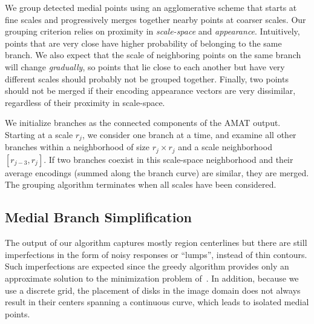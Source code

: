\documentclass[10pt,twocolumn,letterpaper]{article}
\begin{document}
We group detected medial points using an agglomerative scheme that starts at fine scales and
progressively merges together nearby points at coarser scales.
Our grouping criterion relies on proximity in \emph{scale-space} and \emph{appearance}.
Intuitively, points that are very close have higher probability of belonging to the same branch.
We also expect that the scale of neighboring points on the same branch will change \emph{gradually},
so points that lie close to each another but have very different scales should probably not be grouped together.
Finally, two points should not be merged if their encoding appearance vectors are very dissimilar,
regardless of their proximity in scale-space. 

We initialize branches as the connected components of the AMAT output.
Starting at a scale $r_j$, we consider one branch at a time, and examine all other
branches within a neighborhood of size $r_j \times r_j$ and a scale neighborhood $[r_{j-3},r_j]$.
If two branches coexist in this scale-space neighborhood and their average encodings 
(summed along the branch curve) are similar, they are merged.
The grouping algorithm terminates when all scales have been considered.



\subsection{Medial Branch Simplification}\label{sec:method:simplification}
The output of our algorithm captures mostly region centerlines but there are still
imperfections in the form of noisy responses or ``lumps'', instead of thin contours.
Such imperfections are expected since the greedy algorithm provides only an approximate solution
to the minimization problem of~. 
In addition, because we use a discrete grid, the placement of disks 
in the image domain does not always result in their centers spanning a continuous curve, 
which leads to isolated medial points.
\end{document}
